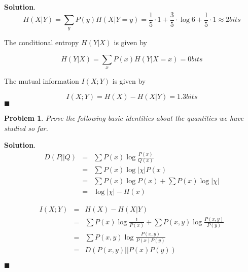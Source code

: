 \documentclass[12pt]{article}
\newtheorem{p}{Problem}[section]
\theoremstyle{definition}
\newenvironment{s}{%
        \begin{trivlist} \item \textbf{Solution}. }{%
            \hspace*{\fill} $\blacksquare$\end{trivlist}}%
\begin{document}
{\begin{s}
\begin{equation*}
H(X|Y) = \sum_{y} P(y)H(X|Y=y) = \frac{1}{5}\cdot 1 + \frac{3}{5}\cdot \log 6 + \frac{1}{5}\cdot 1 \approx 2 \si{bits}
\end{equation*}

The conditional entropy $H(Y|X)$ is given by

\begin{equation*}
H(Y|X) = \sum_{x} P(x)H(Y|X=x) =  0 \si{bits}
\end{equation*}

The mutual information $I(X;Y)$ is given by

\begin{equation*}
I(X;Y) = H(X) - H(X|Y) = 1.3\si{bits}
\end{equation*}
\end{s}

\begin{p}
Prove the following basic identities about the quantities we have studied so far.
\end{p}

\begin{s}
\begin{eqnarray}
D(P||Q) &=& \sum P(x)\log \frac{P(x)}{Q(x)}\\
&=& \sum P(x)\log |\chi | P(x)\\
&=& \sum P(x) \log P(x) + \sum P(x)\log |\chi |\\
&=& \log |\chi| - H(x)
\end{eqnarray}

\begin{eqnarray}
I(X;Y) &=& H(X) - H(X|Y)\\
&=& \sum P(x)\log \frac{1}{P(x)} + \sum P(x,y)\log \frac{P(x,y)}{P(y)} \\
&=& \sum P(x,y) \log \frac{P(x,y)}{P(x)P(y)}\\
&=& D(P(x,y)||P(x)P(y))
\end{eqnarray}


\end{s}
\end{document}
